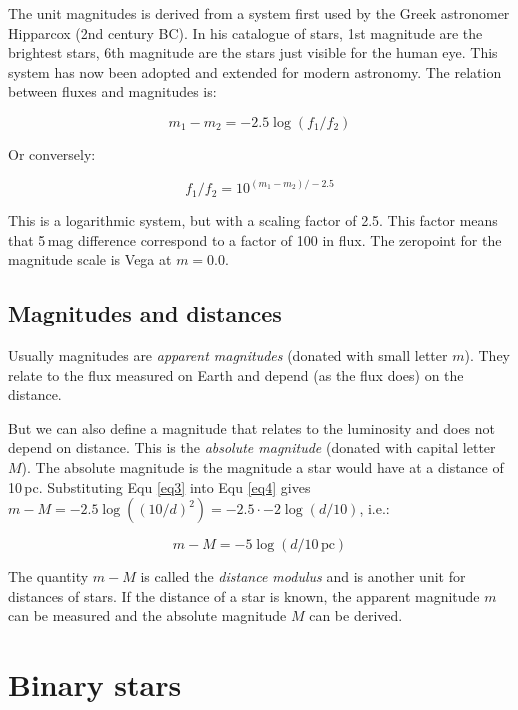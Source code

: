 The unit magnitudes is derived from a system first used by the Greek astronomer Hipparcox (2nd century BC). In his catalogue of stars, 1st magnitude are the brightest stars, 6th magnitude are the stars just visible for the human eye. This system has now been adopted and extended for modern astronomy. The relation between fluxes and magnitudes is:

\begin{equation}
m_1 - m_2 = -2.5 \log{(f_1 / f_2)}
\label{eq4}
\end{equation}

Or conversely:

\begin{equation}
f_1 / f_2 = 10^{(m_1 - m_2) / -2.5}
\label{eq5}
\end{equation}

This is a logarithmic system, but with a scaling factor of 2.5. This factor means that 5\,mag difference correspond to a factor of 100 in flux. The zeropoint for the magnitude scale is Vega at $m = 0.0$.

\subsection{Magnitudes and distances}

Usually magnitudes are \textit{apparent magnitudes} (donated with small letter $m$). They relate to the flux measured on Earth and depend (as the flux does) on the distance. 

But we can also define a magnitude that relates to the luminosity and does not depend on distance. This is the \textit{absolute magnitude} (donated with capital letter $M$). The absolute magnitude is the magnitude a star would have at a distance of 10\,pc. Substituting Equ \eqref{eq3} into Equ \eqref{eq4} gives $m - M = -2.5 \log{ ((10 / d)^2) } =   -2.5 \cdot -2 \log{(d/10)}$, i.e.:

\begin{equation}
m - M = -5 \log{(d/10\,\mathrm{pc})}
\label{eq6}
\end{equation}

The quantity $m-M$ is called the \textit{distance modulus} and is another unit for distances of stars. If the distance of a star is known, the apparent magnitude $m$ can be measured and the absolute magnitude $M$ can be derived. 

\section{Binary stars}

